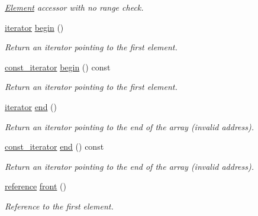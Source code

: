 \begin{DoxyCompactItemize}
\begin{DoxyCompactList}\small\item\em \hyperlink{classpanda_1_1Element}{Element} accessor with no range check. \item\end{DoxyCompactList}\item 
\hyperlink{classpanda_1_1utils_1_1Iterator}{iterator} \hyperlink{classpanda_1_1Array_a8fa2cf8c33bb87c6c398e44e901ad9b9}{begin} ()
\begin{DoxyCompactList}\small\item\em Return an iterator pointing to the first element. \item\end{DoxyCompactList}\item 
\hyperlink{classpanda_1_1utils_1_1Iterator}{const\_\-iterator} \hyperlink{classpanda_1_1Array_a38f03e433d2f19fa1074226fc24a6cdf}{begin} () const 
\begin{DoxyCompactList}\small\item\em Return an iterator pointing to the first element. \item\end{DoxyCompactList}\item 
\hyperlink{classpanda_1_1utils_1_1Iterator}{iterator} \hyperlink{classpanda_1_1Array_a278c908fe61e762996552c696b92b04b}{end} ()
\begin{DoxyCompactList}\small\item\em Return an iterator pointing to the end of the array (invalid address). \item\end{DoxyCompactList}\item 
\hyperlink{classpanda_1_1utils_1_1Iterator}{const\_\-iterator} \hyperlink{classpanda_1_1Array_a677cb1961e6ed9c941e790663eb5fd48}{end} () const 
\begin{DoxyCompactList}\small\item\em Return an iterator pointing to the end of the array (invalid address). \item\end{DoxyCompactList}\item 
\hyperlink{classpanda_1_1Array_a87028232d5fb96ae20e58e1a92dfe708}{reference} \hyperlink{classpanda_1_1Array_a6146a7f7ea2dc73aed0da04c6b903bf0}{front} ()
\begin{DoxyCompactList}\small\item\em Reference to the first element. \item\end{DoxyCompactList}\item 

\end{DoxyCompactItemize}
